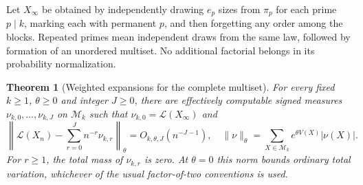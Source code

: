 \documentclass[11pt]{article}
\newtheorem{theorem}{Theorem}[section]
\theoremstyle{definition}\newtheorem{definition}[theorem]{Definition}
\theoremstyle{remark}\newtheorem{remark}[theorem]{Remark}
\begin{document}
Let $X_\infty$ be obtained by independently drawing $e_p$ sizes from $\pi_p$ for each prime $p\mid k$, marking each with permanent $p$, and then forgetting any order among the blocks. Repeated primes mean independent draws from the same law, followed by formation of an unordered multiset. No additional factorial belongs in its probability normalization.

\begin{theorem}[Weighted expansions for the complete multiset]\label{fpm:thm:weighted}
For every fixed $k\ge1$, $\theta\ge0$ and integer $J\ge0$, there are effectively computable signed measures $\nu_{k,0},\ldots,\nu_{k,J}$ on $\mathcal M_k$ such that $\nu_{k,0}=\mathcal L(X_\infty)$ and
\begin{equation}\label{fpm:eq:weighted}
 \left\|\mathcal L(X_n)-\sum_{r=0}^Jn^{-r}\nu_{k,r}\right\|_\theta
 =O_{k,\theta,J}(n^{-J-1}),
 \quad
 \|\nu\|_\theta=\sum_{X\in\mathcal M_k}e^{\theta V(X)}|\nu(X)|.
\end{equation}
For $r\ge1$, the total mass of $\nu_{k,r}$ is zero. At $\theta=0$ this norm bounds ordinary total variation, whichever of the usual factor-of-two conventions is used.
\end{theorem}
\end{document}
